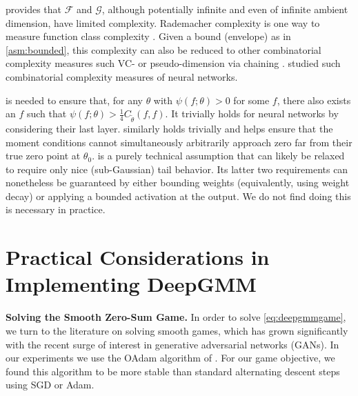 \documentclass{article}
\theoremstyle{plain}
\theoremstyle{definition}
\begin{document}
 provides that $\mathcal F$ and $\mathcal G$, although potentially infinite and even of infinite ambient dimension, have limited complexity. 
Rademacher complexity is one way to measure function class complexity \citep{bartlett2002rademacher}.
Given a bound (envelope) as in \cref{asm:bounded}, this complexity can also be reduced to other combinatorial complexity measures such VC- or pseudo-dimension via chaining \citep{pollard1990empirical}. \citep{bartlett2019nearly} studied such combinatorial complexity measures of neural networks.
%

 is needed to ensure that, for any $\theta$ with $\psi(f;\theta)>0$ for some $f$, there also exists an $f$ such that $\psi(f;\theta)>\frac14C_{\tilde\theta}(f,f)$. It trivially holds for neural networks by considering their last layer.  similarly holds trivially and helps ensure that the moment conditions cannot simultaneously arbitrarily approach zero far from their true zero point at $\theta_0$.  is a purely technical assumption that can likely be relaxed to require only nice (sub-Gaussian) tail behavior. Its latter two requirements can nonetheless be guaranteed by either bounding weights (equivalently, using weight decay) or applying a bounded activation at the output. We do not find doing this is necessary in practice.

%

%

%

%
%
%
%
%
%
%
%
%
%

%


%

%

%

%

%

%

%

%

%

%


%
%
%
%
%
%
%
%
%
%
%
%
%

%
%
%
%
%
%
%
%
%
%
%
%
%
%
%
%

\section{Practical Considerations in Implementing DeepGMM}\label{sec:practicalconsiderations}

{\bf Solving the Smooth Zero-Sum Game.}\label{sec:oadam}
In order to solve \cref{eq:deepgmmgame}, we turn to the literature on solving smooth games, which has grown significantly with the recent surge of interest in generative adversarial networks (GANs). In our experiments we use the OAdam algorithm of \citep{daskalakis2017training}. For our game objective, we found this algorithm to be more stable than standard alternating descent steps using SGD or Adam.
\end{document}
